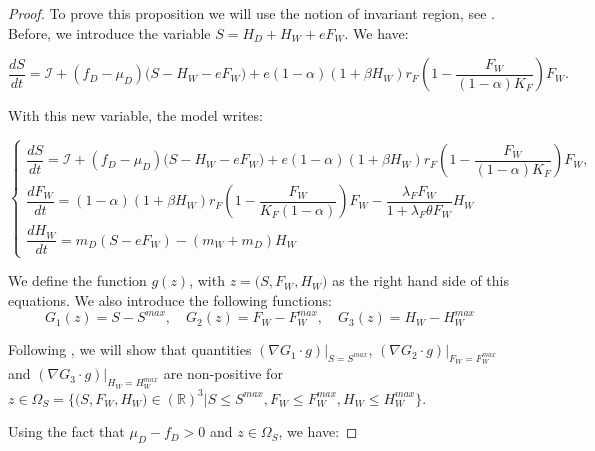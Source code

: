 \documentclass{article}
\newcommand{\lfw}{\lambda_{F}}
\newcommand{\lfw}{\lambda_{F}}
\newcommand{\cI}{\mathcal{I}}
\begin{document}
\begin{proof}
To prove this proposition we will use the notion of invariant region, see \cite{smoller_shock_1994}. Before, we introduce the variable $S = H_D + H_W + e F_W$. We have:

\begin{equation}
\dfrac{dS}{dt} = \cI + (f_D - \mu_D) \Big(S - H_W - eF_W \Big) + e (1-\alpha)(1+\beta H_W)r_F  \left(1 - \dfrac{F_W}{(1-\alpha)K_F} \right) F_W.
\end{equation}

With this new variable, the model writes:

\begin{equation}
\left\{ \begin{array}{l}
\dfrac{dS}{dt} = \cI + (f_D - \mu_D) \Big(S - H_W - e F_W \Big) + e(1-\alpha)(1+\beta H_W) r_F \left(1 - \dfrac{F_W}{(1-\alpha)K_F} \right) F_W, \\
\dfrac{dF_W}{dt} = (1-\alpha)(1+\beta H_W) r_F \left(1 - \dfrac{F_W}{K_F(1-\alpha)} \right) F_W - \dfrac{\lfw F_W}{1 + \lfw \theta F_W} H_W \\
\dfrac{dH_W}{dt}= m_D \left(S - eF_W\right) - (m_W + m_D) H_W 
\end{array} \right.
\label{equationsSFWHW}
\end{equation}


We define the function $g(z)$, with $z=\Big(S, F_W, H_W \Big)$ as the right hand side of this equations. We also introduce the following functions:
$$
G_1(z) = S - S^{max},
\quad
G_2(z) = F_W - F_W^{max},
\quad
G_3(z) = H_W - H_W^{max}
$$

Following \cite{smoller_shock_1994}, we will show that quantities $(\nabla G_1 \cdot g)|_{S = S^{max}}$, $(\nabla G_2 \cdot g)|_{F_W = F_W^{max}}$ and $(\nabla G_3 \cdot g)|_{H_W = H_W^{max}}$ are non-positive for $z \in \Omega_S = \Big\{ \Big(S, F_W, H_W \Big) \in (\mathbb{R})^3  \Big|S \leq S^{max}, F_W \leq F_W^{max}, H_W \leq H_W^{max} \Big\}$.

Using the fact that $\mu_D - f_D >0$ and $z\in \Omega_S$, we have:


\end{proof}
\end{document}

